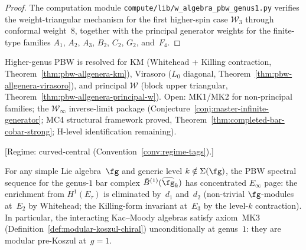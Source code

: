 \begin{proof}
The computation module
\texttt{compute/lib/w\_algebra\_pbw\_genus1.py}
verifies the weight-triangular mechanism for the first
higher-spin case $\mathcal{W}_3$ through conformal weight~$8$,
together with the principal generator weights for the finite-type
families $A_1$, $A_2$, $A_3$, $B_2$, $C_2$, $G_2$, and~$F_4$.
\end{proof}

\begin{remark}\label{rem:mk4-status}
Higher-genus PBW is resolved for KM (Whitehead + Killing contraction,
Theorem~\ref{thm:pbw-allgenera-km}), Virasoro ($L_0$ diagonal,
Theorem~\ref{thm:pbw-allgenera-virasoro}), and principal
$\mathcal{W}$ (block upper triangular,
Theorem~\ref{thm:pbw-allgenera-principal-w}).
Open: MK1/MK2 for non-principal families; the $\mathcal{W}_\infty$
inverse-limit package
(Conjecture~\ref{conj:master-infinite-generator}; MC4 structural framework proved, Theorem~\ref{thm:completed-bar-cobar-strong}; H-level identification remaining).
\end{remark}

\begin{theorem}
\label{thm:pbw-genus1-km}
\textup{[Regime: curved-central
\textup{(}Convention~\textup{\ref{conv:regime-tags})}.]}

For any simple Lie algebra~$\fg$ and generic level
$k \notin \Sigma(\fg)$, the PBW spectral sequence for the
genus-$1$ bar complex
$\bar{B}^{(1)}(\widehat{\fg}_k)$ has concentrated
$E_\infty$ page: the enrichment from $H^1(E_\tau)$
is eliminated by~$d_1$ and~$d_2$
\textup{(}non-trivial $\fg$-modules at~$E_2$
by Whitehead; the Killing-form invariant
at~$E_3$ by the level-$k$ contraction\textup{)}.
In particular, the interacting Kac--Moody algebras satisfy
axiom~\textup{MK3}
\textup{(}Definition~\textup{\ref{def:modular-koszul-chiral})}
unconditionally at genus~$1$:
they are modular pre-Koszul at~$g = 1$.
\end{theorem}

